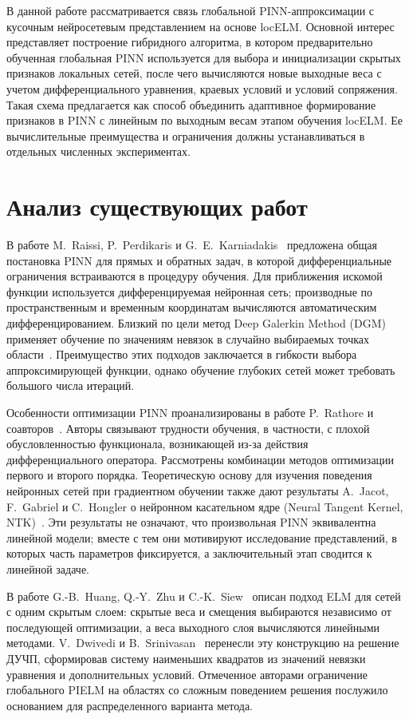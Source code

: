 \documentclass{misisarticle}
\begin{document}
В данной работе рассматривается связь глобальной PINN-аппроксимации с кусочным нейросетевым представлением на основе locELM. Основной интерес представляет построение гибридного алгоритма, в котором предварительно обученная глобальная PINN используется для выбора и инициализации скрытых признаков локальных сетей, после чего вычисляются новые выходные веса с учетом дифференциального уравнения, краевых условий и условий сопряжения. Такая схема предлагается как способ объединить адаптивное формирование признаков в PINN с линейным по выходным весам этапом обучения locELM. Ее вычислительные преимущества и ограничения должны устанавливаться в отдельных численных экспериментах.

\section{Анализ существующих работ}

В работе M.~Raissi, P.~Perdikaris и G.~E.~Karniadakis~\cite{raissi2019} предложена общая постановка PINN для прямых и обратных задач, в которой дифференциальные ограничения встраиваются в процедуру обучения. Для приближения искомой функции используется дифференцируемая нейронная сеть; производные по пространственным и временным координатам вычисляются автоматическим дифференцированием. Близкий по цели метод Deep Galerkin Method (DGM) применяет обучение по значениям невязок в случайно выбираемых точках области~\cite{sirignano2018}. Преимущество этих подходов заключается в гибкости выбора аппроксимирующей функции, однако обучение глубоких сетей может требовать большого числа итераций.

Особенности оптимизации PINN проанализированы в работе P.~Rathore и соавторов~\cite{rathore2024}. Авторы связывают трудности обучения, в частности, с плохой обусловленностью функционала, возникающей из-за действия дифференциального оператора. Рассмотрены комбинации методов оптимизации первого и второго порядка. Теоретическую основу для изучения поведения нейронных сетей при градиентном обучении также дают результаты A.~Jacot, F.~Gabriel и C.~Hongler о нейронном касательном ядре (Neural Tangent Kernel, NTK)~\cite{jacot2018}. Эти результаты не означают, что произвольная PINN эквивалентна линейной модели; вместе с тем они мотивируют исследование представлений, в которых часть параметров фиксируется, а заключительный этап сводится к линейной задаче.

В работе G.-B.~Huang, Q.-Y.~Zhu и C.-K.~Siew~\cite{huang2006} описан подход ELM для сетей с одним скрытым слоем: скрытые веса и смещения выбираются независимо от последующей оптимизации, а веса выходного слоя вычисляются линейными методами. V.~Dwivedi и B.~Srinivasan~\cite{dwivedi2020} перенесли эту конструкцию на решение ДУЧП, сформировав систему наименьших квадратов из значений невязки уравнения и дополнительных условий. Отмеченное авторами ограничение глобального PIELM на областях со сложным поведением решения послужило основанием для распределенного варианта метода.
\end{document}
